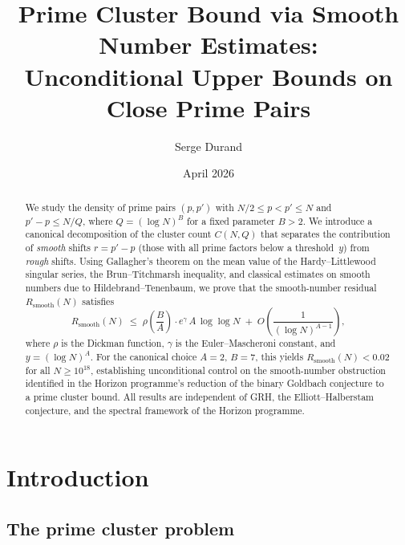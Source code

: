 \documentclass[11pt,reqno]{amsart}
\theoremstyle{plain}
\theoremstyle{definition}
\theoremstyle{remark}
\newcommand{\Rsmooth}{R_{\mathrm{smooth}}}
\begin{document}
\title[Prime Cluster Bound via Smooth Number Estimates]
{Prime Cluster Bound via Smooth Number Estimates:\\
Unconditional Upper Bounds on Close Prime Pairs}

\author{Serge Durand}
\address{Independent Researcher, Paris, France}

\date{April 2026}

\begin{abstract}
We study the density of prime pairs $(p,p')$ with $N/2 \le p < p' \le N$
and $p'-p \le N/Q$, where $Q = (\log N)^B$ for a fixed parameter $B > 2$.
We introduce a canonical decomposition of the cluster count $C(N,Q)$
that separates the contribution of \emph{smooth} shifts $r = p'-p$
(those with all prime factors below a threshold~$y$) from \emph{rough} shifts.
Using Gallagher's theorem on the mean value of the Hardy--Littlewood
singular series, the Brun--Titchmarsh inequality, and classical estimates
on smooth numbers due to Hildebrand--Tenenbaum,
we prove that the smooth-number residual $\Rsmooth(N)$ satisfies
\[
  \Rsmooth(N) \;\le\; \rho\!\left(\frac{B}{A}\right)
  \cdot e^{\gamma}\, A\, \log\log N
  \;+\; O\!\left(\frac{1}{(\log N)^{A-1}}\right),
\]
where $\rho$ is the Dickman function, $\gamma$ is the Euler--Mascheroni
constant, and $y = (\log N)^A$.
For the canonical choice $A = 2$, $B = 7$, this yields
$\Rsmooth(N) < 0.02$ for all $N \ge 10^{18}$,
establishing unconditional control on the smooth-number obstruction
identified in the Horizon programme's reduction of the binary
Goldbach conjecture to a prime cluster bound.
All results are independent of GRH, the Elliott--Halberstam conjecture,
and the spectral framework of the Horizon programme.
\end{abstract}

\maketitle
\setcounter{tocdepth}{2}
\tableofcontents

\section{Introduction}\label{sec:intro}

\subsection{The prime cluster problem}
\end{document}
